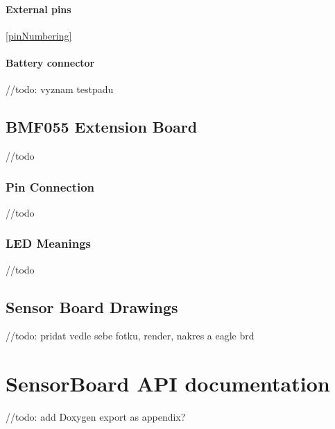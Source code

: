 \subsubsection{External pins} \ref{pinNumbering}
\subsubsection{Battery connector}

//todo: vyznam testpadu

\section{BMF055 Extension Board}
\label{BMF055pinNumbering}
//todo

\subsection{Pin Connection}
//todo

\subsection{LED Meanings}
//todo



\section{Sensor Board Drawings}
//todo: pridat vedle sebe fotku, render, nakres a eagle brd

\chapter{SensorBoard API documentation}
//todo: add Doxygen export as appendix?
